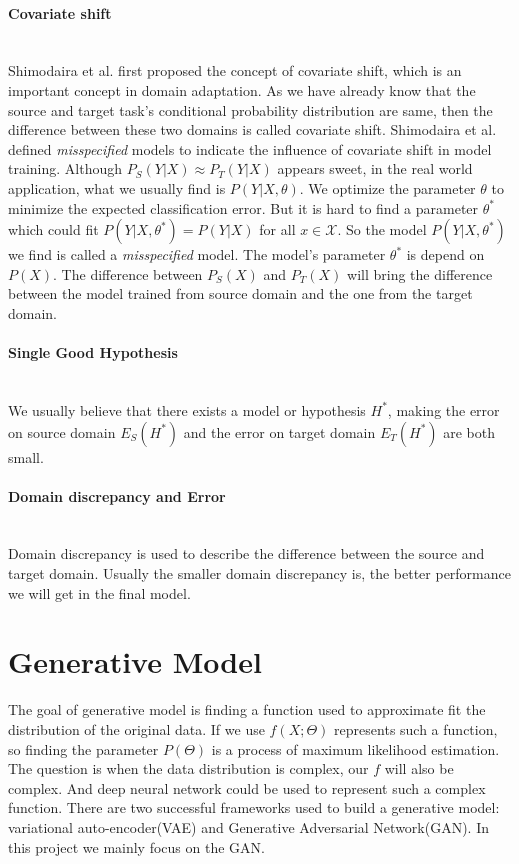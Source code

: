 \documentclass{kththesis}
\begin{document}
\paragraph{Covariate shift}~{}\\
Shimodaira et al.\cite{shimodaira2000improving} first proposed the concept of covariate shift, which is an important concept in domain adaptation. As we have already know that the source and target task's conditional probability distribution are same, then the difference between these two domains is called covariate shift. Shimodaira et al.\cite{shimodaira2000improving} defined \emph{misspecified} models to indicate the influence of covariate shift in model training. Although $P_S(Y|X) \approx P_T(Y|X)$ appears sweet, in the real world application, what we usually find is $P(Y|X,\theta)$. We optimize the parameter $\theta$ to minimize the expected classification error. But it is hard to find a parameter $\theta^*$ which could fit $P(Y|X,\theta^*) = P(Y|X)$ for all $x \in \mathcal{X}$. So the model $P(Y|X,\theta^*)$ we find is called a \emph{misspecified} model. The model's parameter $\theta^*$ is depend on $P(X)$. The difference between $P_S(X)$ and $P_T(X)$ will bring the difference between the model trained from source domain and the one from the target domain. 

\paragraph{Single Good Hypothesis}~{}\\
We usually believe that there exists a model or hypothesis $H^*$, making the error on source domain $E_S(H^*)$ and the error on target domain $E_T(H^*)$ are both small. 

\paragraph{Domain discrepancy and Error}~{}\\
Domain discrepancy is used to describe the difference between the source and target domain. Usually the smaller domain discrepancy is, the better performance we will get in the final model. 


\section{Generative Model}
The goal of generative model is finding a function used to approximate fit the distribution of the original data. If we use $f(X;\Theta)$ represents such a function, so finding the parameter $P(\Theta)$ is a process of maximum likelihood estimation. The question is when the data distribution is complex, our $f$ will also be complex. And deep neural network could be used to represent such a complex function. There are two successful frameworks used to build a generative model: variational auto-encoder(VAE) and Generative Adversarial Network(GAN). In this project we mainly focus on the GAN. 
\end{document}
